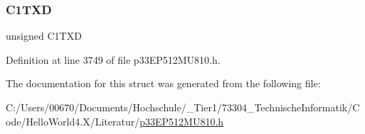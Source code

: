 \mbox{\label{structtag_c1_t_x_d_b_i_t_s_a3fdcb1581ddac37804eb73ff225fe456}} 
\subsubsection{\texorpdfstring{C1\+T\+XD}{C1TXD}}
{\footnotesize\ttfamily unsigned C1\+T\+XD}



Definition at line 3749 of file p33\+E\+P512\+M\+U810.\+h.



The documentation for this struct was generated from the following file\+:\begin{DoxyCompactItemize}
\item 
C\+:/\+Users/00670/\+Documents/\+Hochschule/\+\_\+\+Tier1/73304\+\_\+\+Technische\+Informatik/\+Code/\+Hello\+World4.\+X/\+Literatur/\hyperlink{p33_e_p512_m_u810_8h}{p33\+E\+P512\+M\+U810.\+h}\end{DoxyCompactItemize}
